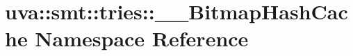 \hypertarget{namespaceuva_1_1smt_1_1tries_1_1_____bitmap_hash_cache}{}\section{uva\+:\+:smt\+:\+:tries\+:\+:\+\_\+\+\_\+\+Bitmap\+Hash\+Cache Namespace Reference}
\label{namespaceuva_1_1smt_1_1tries_1_1_____bitmap_hash_cache}
